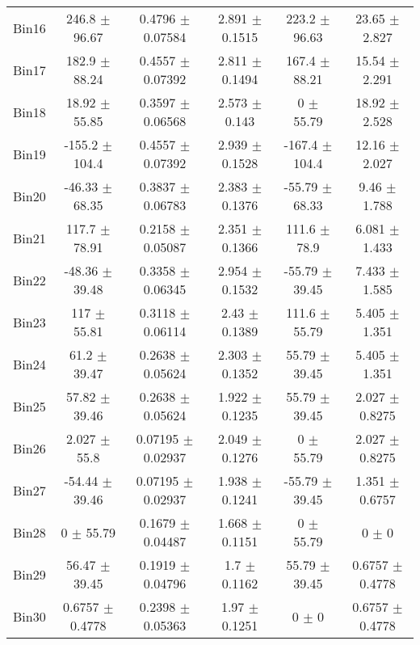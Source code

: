 \begin{tabular}{@{\extracolsep{4pt}}lccccc@{}}
     Bin16 & 246.8 $\pm$ 96.67 & 0.4796 $\pm$ 0.07584 & 2.891 $\pm$ 0.1515 & 223.2 $\pm$ 96.63 & 23.65 $\pm$ 2.827 \\ 
     Bin17 & 182.9 $\pm$ 88.24 & 0.4557 $\pm$ 0.07392 & 2.811 $\pm$ 0.1494 & 167.4 $\pm$ 88.21 & 15.54 $\pm$ 2.291 \\ 
     Bin18 & 18.92 $\pm$ 55.85 & 0.3597 $\pm$ 0.06568 & 2.573 $\pm$ 0.143 & 0 $\pm$ 55.79 & 18.92 $\pm$ 2.528 \\ 
     Bin19 & -155.2 $\pm$ 104.4 & 0.4557 $\pm$ 0.07392 & 2.939 $\pm$ 0.1528 & -167.4 $\pm$ 104.4 & 12.16 $\pm$ 2.027 \\ 
     Bin20 & -46.33 $\pm$ 68.35 & 0.3837 $\pm$ 0.06783 & 2.383 $\pm$ 0.1376 & -55.79 $\pm$ 68.33 & 9.46 $\pm$ 1.788 \\ 
     Bin21 & 117.7 $\pm$ 78.91 & 0.2158 $\pm$ 0.05087 & 2.351 $\pm$ 0.1366 & 111.6 $\pm$ 78.9 & 6.081 $\pm$ 1.433 \\ 
     Bin22 & -48.36 $\pm$ 39.48 & 0.3358 $\pm$ 0.06345 & 2.954 $\pm$ 0.1532 & -55.79 $\pm$ 39.45 & 7.433 $\pm$ 1.585 \\ 
     Bin23 & 117 $\pm$ 55.81 & 0.3118 $\pm$ 0.06114 & 2.43 $\pm$ 0.1389 & 111.6 $\pm$ 55.79 & 5.405 $\pm$ 1.351 \\ 
     Bin24 & 61.2 $\pm$ 39.47 & 0.2638 $\pm$ 0.05624 & 2.303 $\pm$ 0.1352 & 55.79 $\pm$ 39.45 & 5.405 $\pm$ 1.351 \\ 
     Bin25 & 57.82 $\pm$ 39.46 & 0.2638 $\pm$ 0.05624 & 1.922 $\pm$ 0.1235 & 55.79 $\pm$ 39.45 & 2.027 $\pm$ 0.8275 \\ 
     Bin26 & 2.027 $\pm$ 55.8 & 0.07195 $\pm$ 0.02937 & 2.049 $\pm$ 0.1276 & 0 $\pm$ 55.79 & 2.027 $\pm$ 0.8275 \\ 
     Bin27 & -54.44 $\pm$ 39.46 & 0.07195 $\pm$ 0.02937 & 1.938 $\pm$ 0.1241 & -55.79 $\pm$ 39.45 & 1.351 $\pm$ 0.6757 \\ 
     Bin28 & 0 $\pm$ 55.79 & 0.1679 $\pm$ 0.04487 & 1.668 $\pm$ 0.1151 & 0 $\pm$ 55.79 & 0 $\pm$ 0 \\ 
     Bin29 & 56.47 $\pm$ 39.45 & 0.1919 $\pm$ 0.04796 & 1.7 $\pm$ 0.1162 & 55.79 $\pm$ 39.45 & 0.6757 $\pm$ 0.4778 \\ 
     Bin30 & 0.6757 $\pm$ 0.4778 & 0.2398 $\pm$ 0.05363 & 1.97 $\pm$ 0.1251 & 0 $\pm$ 0 & 0.6757 $\pm$ 0.4778 \\ 
\hline\hline
  \end{tabular}
